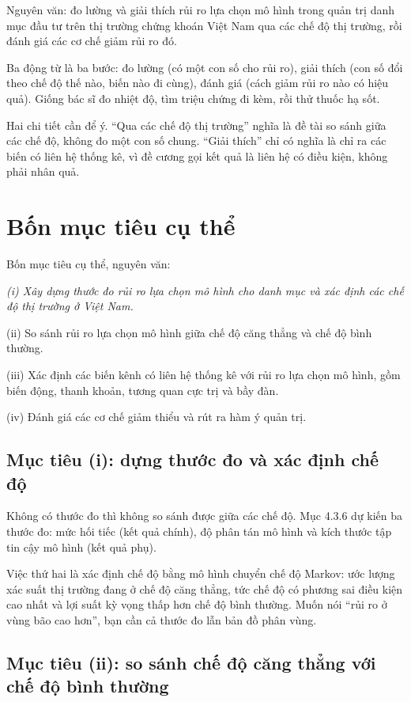 Nguyên văn: đo lường và giải thích rủi ro lựa chọn mô hình trong quản trị danh mục đầu tư trên thị trường chứng khoán Việt Nam qua các chế độ thị trường, rồi đánh giá các cơ chế giảm rủi ro đó.

Ba động từ là ba bước: đo lường (có một con số cho rủi ro), giải thích (con số đổi theo chế độ thế nào, biến nào đi cùng), đánh giá (cách giảm rủi ro nào có hiệu quả). Giống bác sĩ đo nhiệt độ, tìm triệu chứng đi kèm, rồi thử thuốc hạ sốt.

Hai chi tiết cần để ý. “Qua các chế độ thị trường” nghĩa là đề tài so sánh giữa các chế độ, không đo một con số chung. “Giải thích” chỉ có nghĩa là chỉ ra các biến có liên hệ thống kê, vì đề cương gọi kết quả là liên hệ có điều kiện, không phải nhân quả.

\section{Bốn mục tiêu cụ thể}

Bốn mục tiêu cụ thể, nguyên văn:

{\itshape (i) Xây dựng thước đo rủi ro lựa chọn mô hình cho danh mục và xác định các chế độ thị trường ở Việt Nam.

(ii) So sánh rủi ro lựa chọn mô hình giữa chế độ căng thẳng và chế độ bình thường.

(iii) Xác định các biến kênh có liên hệ thống kê với rủi ro lựa chọn mô hình, gồm biến động, thanh khoản, tương quan cực trị và bầy đàn.

(iv) Đánh giá các cơ chế giảm thiểu và rút ra hàm ý quản trị.\par}

\subsection{Mục tiêu (i): dựng thước đo và xác định chế độ}

Không có thước đo thì không so sánh được giữa các chế độ. Mục 4.3.6 dự kiến ba thước đo: mức hối tiếc (kết quả chính), độ phân tán mô hình và kích thước tập tin cậy mô hình (kết quả phụ).

Việc thứ hai là xác định chế độ bằng mô hình chuyển chế độ Markov: ước lượng xác suất thị trường đang ở chế độ căng thẳng, tức chế độ có phương sai điều kiện cao nhất và lợi suất kỳ vọng thấp hơn chế độ bình thường. Muốn nói “rủi ro ở vùng bão cao hơn”, bạn cần cả thước đo lẫn bản đồ phân vùng.

\subsection{Mục tiêu (ii): so sánh chế độ căng thẳng với chế độ bình thường}

